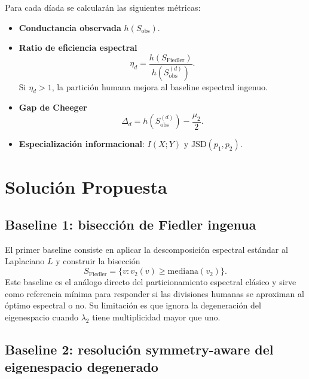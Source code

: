 \documentclass[conference]{IEEEtran}
\begin{document}
Para cada díada se calcularán las siguientes métricas:
\begin{itemize}
    \item \textbf{Conductancia observada} $h(S_{\mathrm{obs}})$.
    \item \textbf{Ratio de eficiencia espectral}
    \begin{equation}
    \eta_d=\frac{h(S_{\mathrm{Fiedler}})}{h(S_{\mathrm{obs}}^{(d)})}.
    \end{equation}
    Si $\eta_d > 1$, la partición humana mejora al baseline espectral ingenuo.
    \item \textbf{Gap de Cheeger}
    \begin{equation}
    \Delta_d=h(S_{\mathrm{obs}}^{(d)})-\frac{\mu_2}{2}.
    \end{equation}
    \item \textbf{Especialización informacional}: $I(X;Y)$ y $\mathrm{JSD}(p_1,p_2)$.
\end{itemize}

\section{Solución Propuesta}

\subsection{Baseline 1: bisección de Fiedler ingenua}

El primer baseline consiste en aplicar la descomposición espectral estándar al Laplaciano $L$ y construir la bisección
\begin{equation}
S_{\mathrm{Fiedler}}=\{v : v_2(v)\ge \mathrm{mediana}(v_2)\}.
\end{equation}
Este baseline es el análogo directo del particionamiento espectral clásico y sirve como referencia mínima para responder si las divisiones humanas se aproximan al óptimo espectral o no. Su limitación es que ignora la degeneración del eigenespacio cuando $\lambda_2$ tiene multiplicidad mayor que uno.

\subsection{Baseline 2: resolución symmetry-aware del eigenespacio degenerado}
\end{document}
